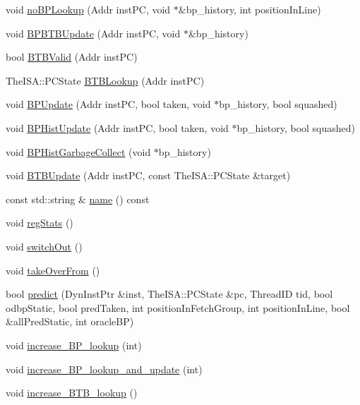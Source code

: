 \begin{DoxyCompactItemize}
\item 
void \hyperlink{classBPredUnit_af5b3e6db0cf1f00dee290e16765f28f8}{noBPLookup} (Addr instPC, void $\ast$\&bp\_\-history, int positionInLine)
\item 
void \hyperlink{classBPredUnit_a55a6608f958c4e70360c34bd48c57032}{BPBTBUpdate} (Addr instPC, void $\ast$\&bp\_\-history)
\item 
bool \hyperlink{classBPredUnit_a66a1f6f9cdd28b38b005a666a9976ed7}{BTBValid} (Addr instPC)
\item 
TheISA::PCState \hyperlink{classBPredUnit_a31024f2d92bfd7e778a790f4c6f61498}{BTBLookup} (Addr instPC)
\item 
void \hyperlink{classBPredUnit_a35c57ae0661f1d5dd2169e919741d47b}{BPUpdate} (Addr instPC, bool taken, void $\ast$bp\_\-history, bool squashed)
\item 
void \hyperlink{classBPredUnit_a16de9793a28ee07dcf26d89c03328555}{BPHistUpdate} (Addr instPC, bool taken, void $\ast$bp\_\-history, bool squashed)
\item 
void \hyperlink{classBPredUnit_a9268abcbddfdfd6e6a076ecd343a3de5}{BPHistGarbageCollect} (void $\ast$bp\_\-history)
\item 
void \hyperlink{classBPredUnit_a5afe025cde23c608d745e8daca63e8a6}{BTBUpdate} (Addr instPC, const TheISA::PCState \&target)
\item 
const std::string \& \hyperlink{classBPredUnit_aeaaeb15f110f0ed58cc3161d6f6ace22}{name} () const 
\item 
void \hyperlink{classBPredUnit_a0cffcea165538b2e7fd554a92b8d9b85}{regStats} ()
\item 
void \hyperlink{classBPredUnit_ac33c3d29c7b6aca9578fc416eb34e60e}{switchOut} ()
\item 
void \hyperlink{classBPredUnit_a9011bcc9143d2396dfec49828484a645}{takeOverFrom} ()
\item 
bool \hyperlink{classBPredUnit_add836c4a521ed2bd12eca4d1dee13620}{predict} (DynInstPtr \&inst, TheISA::PCState \&pc, ThreadID tid, bool odbpStatic, bool predTaken, int positionInFetchGroup, int positionInLine, bool \&allPredStatic, int oracleBP)
\item 
void \hyperlink{classBPredUnit_a89690e897bb5661ee868f659a06515c9}{increase\_\-BP\_\-lookup} (int)
\item 
void \hyperlink{classBPredUnit_a471a1acb994d07a6d57b2f39ce56e6a4}{increase\_\-BP\_\-lookup\_\-and\_\-update} (int)
\item 
void \hyperlink{classBPredUnit_a41ecb08c99f45538eaf1de4e184905b4}{increase\_\-BTB\_\-lookup} ()

\end{DoxyCompactItemize}
